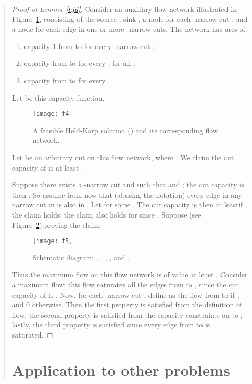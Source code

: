 \documentclass[11pt,letterpaper]{article}
\begin{document}
\begin{quote}
\begin{proof}[Proof of Lemma~\ref{l:fd}]
Consider an auxiliary flow network illustrated in Figure~\ref{f:fd}, consisting of the source , sink , a node  for each -narrow cut , and a node  for each edge  in one or more -narrow cuts. The network has arcs of:\begin{enumerate}
\item capacity 1 from  to  for every -narrow cut ;
\item capacity  from  to  for every , for all ;
\item capacity  from  to  for every .
\end{enumerate} Let  be this capacity function.

\begin{figure}
\center
\texttt{[image: f4]}
\caption{A feasible Held-Karp solution () and its corresponding flow network.}
\label{f:fd}
\end{figure}

Let  be an arbitrary cut on this flow network, where . We claim the cut capacity of  is at least .

Suppose there exists a -narrow cut  and  such that  and ; the cut capacity is then . So assume from now that (abusing the notation) every edge in any -narrow cut in  is also in . Let  for some . The cut capacity is then at leastif , the claim holds; the claim also holds for  since . Suppose  (see Figure~\ref{f:fd2}).proving the claim.

\begin{figure}
\center
\texttt{[image: f5]}
\caption{Schematic diagram: , , , , and .}
\label{f:fd2}
\end{figure}

Thus the maximum flow on this flow network is of value at least . Consider a maximum flow; this flow saturates all the edges from  to , since the cut capacity of  is . Now, for each -narrow cut , define  as the flow from  to  if , and 0 otherwise. Then the first property is satisfied from the definition of flow; the second property is satisfied from the capacity constraints on  to ; lastly, the third property is satisfied since every edge from  to  is saturated.
\end{proof}

\section{Application to other problems}\label{s:appl}


\end{quote}
\end{document}
